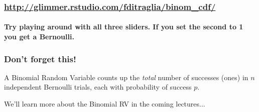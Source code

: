 \documentclass[handout]{beamer}
\begin{document}
\begin{frame}
	\frametitle{\href{http://glimmer.rstudio.com/fditraglia/binom_cdf/}{http://glimmer.rstudio.com/fditraglia/binom\_cdf/}}
\framesubtitle{Try playing around with all three sliders. If you set the second to 1 you get a Bernoulli.}

\begin{figure}
\end{figure}

\end{frame}




\begin{frame}
\frametitle{Don't forget this!}
 \large A Binomial Random Variable counts up the \emph{total} number of successes (ones) in $n$ independent Bernoulli trials, each with probability of success $p$.


\vspace{5em}
\alert{We'll learn more about the Binomial RV in the coming lectures...}
\end{frame}
\end{document}
